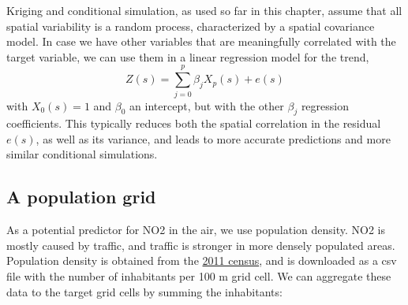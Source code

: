 \documentclass[]{book}
\newenvironment{Shaded}{\begin{snugshade}}{\end{snugshade}}
\newcommand{\CommentTok}[1]{\textcolor[rgb]{0.56,0.35,0.01}{\textit{#1}}}
\newcommand{\DataTypeTok}[1]{\textcolor[rgb]{0.13,0.29,0.53}{#1}}
\newcommand{\DecValTok}[1]{\textcolor[rgb]{0.00,0.00,0.81}{#1}}
\newcommand{\KeywordTok}[1]{\textcolor[rgb]{0.13,0.29,0.53}{\textbf{#1}}}
\newcommand{\NormalTok}[1]{#1}
\newcommand{\OperatorTok}[1]{\textcolor[rgb]{0.81,0.36,0.00}{\textbf{#1}}}
\newcommand{\OtherTok}[1]{\textcolor[rgb]{0.56,0.35,0.01}{#1}}
\newcommand{\StringTok}[1]{\textcolor[rgb]{0.31,0.60,0.02}{#1}}
\begin{document}
Kriging and conditional simulation, as used so far in this
chapter, assume that all spatial variability is a random process,
characterized by a spatial covariance model. In case we have other
variables that are meaningfully correlated with the target variable,
we can use them in a linear regression model for the trend,
\[
Z(s) = \sum_{j=0}^p \beta_j X_p(s) + e(s)
\]
with \(X_0(s) = 1\) and \(\beta_0\) an intercept, but with the other
\(\beta_j\) regression coefficients. This typically reduces both the
spatial correlation in the residual \(e(s)\), as well as its variance,
and leads to more accurate predictions and more similar conditional
simulations.

\hypertarget{a-population-grid}{%
\subsection{A population grid}\label{a-population-grid}}

As a potential predictor for NO2 in the air, we use population
density. NO2 is mostly caused by traffic, and traffic is stronger
in more densely populated areas.
Population density is obtained from the \href{https://www.zensus2011.de/DE/Home/Aktuelles/DemografischeGrunddaten.html}{2011 census}, and is downloaded as a csv file with the number of inhabitants per 100 m grid cell. We can aggregate these data to the target grid cells by summing the inhabitants:

\begin{Shaded}
\end{Shaded}
\end{document}
